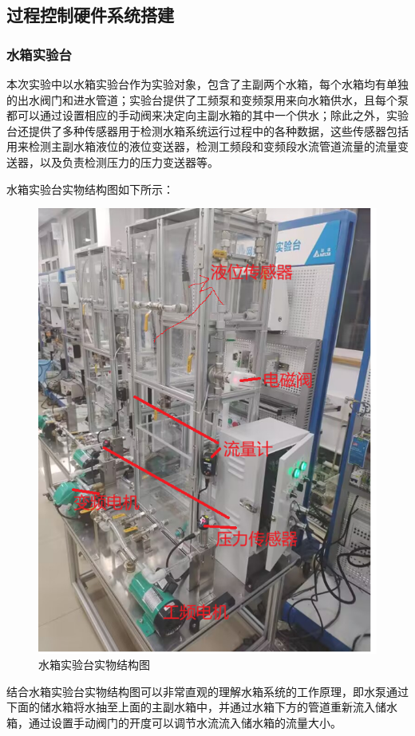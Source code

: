 \documentclass[UTF8]{article}
\begin{document}
\subsection{过程控制硬件系统搭建}
\subsubsection{水箱实验台}
本次实验中以水箱实验台作为实验对象，包含了主副两个水箱，每个水箱均有单独的出水阀门和进水管道；实验台提供了工频泵和变频泵用来向水箱供水，且每个泵都可以通过设置相应的手动阀来决定向主副水箱的其中一个供水；除此之外，实验台还提供了多种传感器用于检测水箱系统运行过程中的各种数据，这些传感器包括用来检测主副水箱液位的液位变送器，检测工频段和变频段水流管道流量的流量变送器，以及负责检测压力的压力变送器等。

水箱实验台实物结构图如下所示：
\begin{figure}[H]
    \centering %
    \includegraphics[width=.6\textwidth]{figure/水箱实验台实物结构图.png} 
    \caption{水箱实验台实物结构图} %
\end{figure}

结合水箱实验台实物结构图可以非常直观的理解水箱系统的工作原理，即水泵通过下面的储水箱将水抽至上面的主副水箱中，并通过水箱下方的管道重新流入储水箱，通过设置手动阀门的开度可以调节水流流入储水箱的流量大小。

\end{document}
